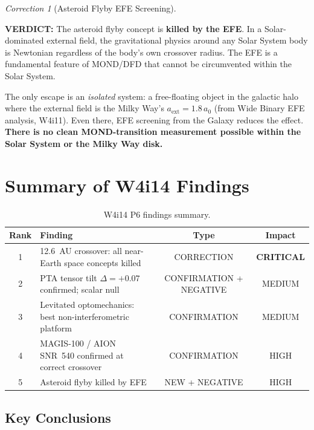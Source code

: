 \documentclass[11pt]{article}
\theoremstyle{definition}
\theoremstyle{remark}
\newtheorem{correction}[theorem]{Correction}
\newcommand{\azero}{a_0}
\newcommand{\verdict}[1]{\textcolor{green!50!black}{\textbf{VERDICT:} #1}}
\begin{document}
\begin{enumerate}
\begin{correction}[Asteroid Flyby EFE Screening]
  \verdict{The asteroid flyby concept is \textbf{killed by the EFE}.
  In a Solar-dominated external field, the gravitational physics around
  any Solar System body is Newtonian regardless of the body's own
  crossover radius. The EFE is a fundamental feature of MOND/DFD that
  cannot be circumvented within the Solar System.

  The only escape is an \emph{isolated} system: a free-floating
  object in the galactic halo where the external field is the
  Milky Way's $a_{\mathrm{ext}} = 1.8\,\azero$ (from Wide Binary
  EFE analysis, W4i11). Even there, EFE screening from the
  Galaxy reduces the effect. \textbf{There is no clean
  MOND-transition measurement possible within the Solar System
  or the Milky Way disk.}}
  \end{correction}
\end{enumerate}

\section{Summary of W4i14 Findings}
\label{sec:summary}

\begin{table}[H]
\centering
\small
\caption{W4i14 P6 findings summary.}
\begin{tabular}{@{}clcc@{}}
\toprule
Rank & Finding & Type & Impact \\
\midrule
1 & 12.6~AU crossover: all near-Earth space concepts killed &
  CORRECTION & \textbf{CRITICAL} \\
2 & PTA tensor tilt $\Delta = +0.07$ confirmed; scalar null &
  CONFIRMATION + NEGATIVE & MEDIUM \\
3 & Levitated optomechanics: best non-interferometric platform &
  CONFIRMATION & MEDIUM \\
4 & MAGIS-100 / AION SNR~540 confirmed at correct crossover &
  CONFIRMATION & HIGH \\
5 & Asteroid flyby killed by EFE &
  NEW + NEGATIVE & HIGH \\
\bottomrule
\end{tabular}
\end{table}

\subsection*{Key Conclusions}
\end{document}
